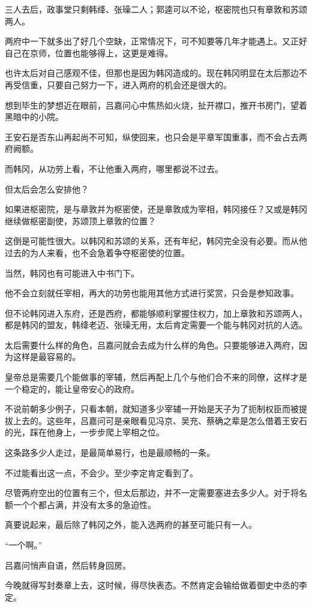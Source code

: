 三人去后，政事堂只剩韩绛、张璪二人；郭逵可以不论，枢密院也只有章敦和苏颂两人。

两府中一下就多出了好几个空缺，正常情况下，可不知要等几年才能遇上。又正好自己在京师，位置也能够得上，这更是难得。

也许太后对自己感观不佳，但那也是因为韩冈造成的。现在韩冈明显在太后那边不再受信重，只要自己努力一下，进入两府的机会还是很大的。

想到毕生的梦想近在眼前，吕嘉问心中焦热如火烧，扯开襟口，推开书房门，望着黑暗中的小院。

王安石是否东山再起尚不可知，纵使回来，也只会是平章军国重事，而不会占去两府阙额。

而韩冈，从功劳上看，不让他重入两府，哪里都说不过去。

但太后会怎么安排他？

如果进枢密院，是与章敦并为枢密使，还是章敦成为宰相，韩冈接任？又或是韩冈继续做枢密副使，苏颂顶上章敦的位置？

这倒是可能性很大。以韩冈和苏颂的关系，还有年纪，韩冈完全没有必要。而从他过去的为人来看，也不会急着争夺枢密使的位置。

当然，韩冈也有可能进入中书门下。

他不会立刻就任宰相，再大的功劳也能用其他方式进行奖赏，只会是参知政事。

但不论韩冈进入东府，还是西府，都能够顺利掌握住权力，加上章敦和苏颂两人，都是韩冈的盟友，韩绛老迈、张璪无用，太后肯定需要一个能与韩冈对抗的人选。

太后需要什么样的角色，吕嘉问就会去成为什么样的角色。只要能够进入两府，因为这样是最容易的。

皇帝总是需要几个能做事的宰辅，然后再配上几个与他们合不来的同僚，这样才是一个稳定的，能让皇帝安心的政府。

不说前朝多少例子，只看本朝，就知道多少宰辅一开始是天子为了扼制权臣而被提拔上去的。这些年，吕嘉问可是亲眼看见冯京、吴充、蔡确之辈是怎么借着王安石的光，踩在他身上，一步步爬上宰相之位。

这条路多少人走过，是最简单易行，也是最顺畅的一条。

不过能看出这一点，不会少。至少李定肯定看到了。

尽管两府空出的位置有三个，但太后那边，并不一定需要塞进去多少人。对于将名额一个个都占满，并没有太多的急迫性。

真要说起来，最后除了韩冈之外，能入选两府的甚至可能只有一人。

“一个啊。”

吕嘉问悄声自语，然后转身回房。

今晚就得写封奏章上去，这时候，得尽快表态。不然肯定会输给做着御史中丞的李定。

